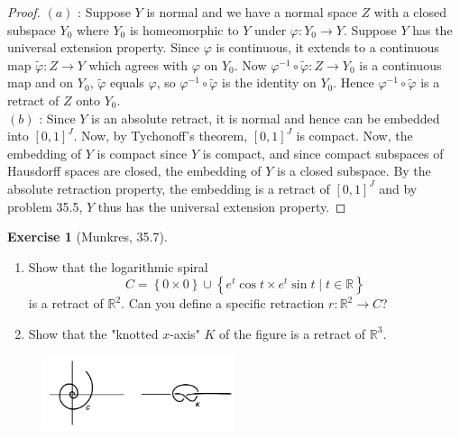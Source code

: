 \documentclass[reqno]{amsart}
\theoremstyle{plain}%
\theoremstyle{definition}
\newtheorem{exercise}[theorem]{Exercise}
\theoremstyle{remark}
\begin{document}
\begin{proof}
    $(a)$ : Suppose $Y$ is normal and we have a normal space
    $Z$ with a closed subspace $Y_0$ where $Y_0$ is homeomorphic to
    $Y$ under $\varphi  \colon Y_0 \to Y$. Suppose $Y$ has the universal
    extension property. Since $\varphi$ is continuous, it extends to
    a continuous map $\tilde{\varphi}  \colon Z \to Y$ which agrees with
    $\varphi$ on $Y_0$. Now
    $\varphi^{-1} \circ \tilde{\varphi}  \colon Z \to Y_0$ is a continuous map
    and on $Y_0$, $\tilde{\varphi}$ equals $\varphi$, so
    $\varphi^{-1} \circ \tilde{\varphi}$ is the identity on
    $Y_0$. Hence $\varphi^{-1} \circ \tilde{\varphi}$ is a retract
    of $Z$ onto $Y_0$.\\
    \linebreak
    $(b)$ : Since $Y$ is an absolute retract, it is normal and hence
    can be embedded into $\left[ 0,1 \right]^{J}$. Now, by Tychonoff's theorem, 
    $\left[ 0,1 \right]^{J}$ is compact. Now, the embedding of
    $Y$ is compact since $Y$ is compact, and since compact subspaces of
    Hausdorff spaces are closed, the embedding of $Y$ is a closed subspace.
    By the absolute retraction property, the embedding is a retract of
    $\left[ 0,1 \right]^{J}$ and by problem
    35.5, $Y$ thus has the universal extension property.
\end{proof}

\begin{exercise}[Munkres, 35.7]
    \begin{enumerate}
        \item Show that the logarithmic spiral
    \[
    C = \left\{ 0 \times 0 \right\} \cup
    \left\{ e^{t} \cos t \times  e^{t} \sin t  \mid  t \in \mathbb{R} \right\} 
    \] 
    is a retract of $\mathbb{R}^2$. Can you define a specific retraction
    $r  \colon \mathbb{R}^2 \to C$?
\item Show that the "knotted $x$-axis" $K$ of the figure is a retract of
    $\mathbb{R}^3$.
    \end{enumerate}
    \begin{figure}[H]
        \centering
        \includegraphics[width=0.5\textwidth]{retracts.png}
        \label{fig:retracts-png}
    \end{figure}
\end{exercise}
\end{document}

